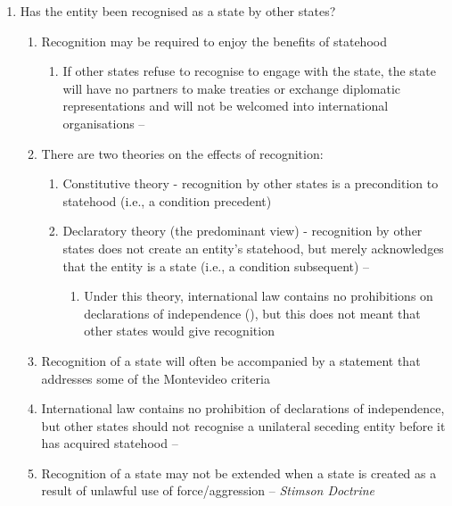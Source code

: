 \begin{enumerate}
\begin{enumerate}
    \end{enumerate}
    \item Has the entity been recognised as a state by other states?
    \begin{enumerate}
        \item Recognition may be required to enjoy the benefits of statehood
        \begin{enumerate}
            \item If other states refuse to recognise to engage with the state, the state will have no partners to make treaties or exchange diplomatic representations and will not be welcomed into international organisations -- 
        \end{enumerate}
        \item There are two theories on the effects of recognition:
        \begin{enumerate}
            \item Constitutive theory - recognition by other states is a precondition to statehood (i.e., a condition precedent)
            \item Declaratory theory (the predominant view) - recognition by other states does not create an entity's statehood, but merely acknowledges that the entity is a state (i.e., a condition subsequent) -- 
            \begin{enumerate}
                \item Under this theory, international law contains no prohibitions on declarations of independence (), but this does not meant that other states would give recognition
            \end{enumerate}
        \end{enumerate}
        \item Recognition of a state will often be accompanied by a statement that addresses some of the Montevideo criteria
        \item International law contains no prohibition of declarations of independence, but other states should not recognise a unilateral seceding entity before it has acquired statehood -- 
        \item Recognition of a state may not be extended when a state is created as a result of unlawful use of force/aggression -- \textit{Stimson Doctrine}
        \begin{enumerate}

\end{enumerate}
\end{enumerate}
\end{enumerate}
